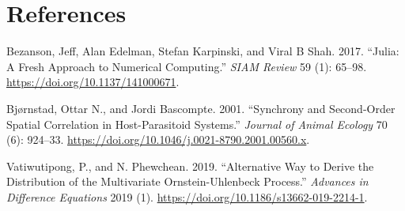 \documentclass{article}
\begin{document}
\newpage

\hypertarget{references}{%
\section*{References}\label{references}}

\hypertarget{refs}{}
\leavevmode\hypertarget{ref-Julia-2017}{}%
Bezanson, Jeff, Alan Edelman, Stefan Karpinski, and Viral B Shah. 2017.
``Julia: A Fresh Approach to Numerical Computing.'' \emph{SIAM Review}
59 (1): 65--98. \url{https://doi.org/10.1137/141000671}.

\leavevmode\hypertarget{ref-Bjrnstad2001}{}%
Bjørnstad, Ottar N., and Jordi Bascompte. 2001. ``Synchrony and
Second-Order Spatial Correlation in Host-Parasitoid Systems.''
\emph{Journal of Animal Ecology} 70 (6): 924--33.
\url{https://doi.org/10.1046/j.0021-8790.2001.00560.x}.

\leavevmode\hypertarget{ref-Vatiwutipong2019}{}%
Vatiwutipong, P., and N. Phewchean. 2019. ``Alternative Way to Derive
the Distribution of the Multivariate Ornstein-Uhlenbeck Process.''
\emph{Advances in Difference Equations} 2019 (1).
\url{https://doi.org/10.1186/s13662-019-2214-1}.



\end{document}
